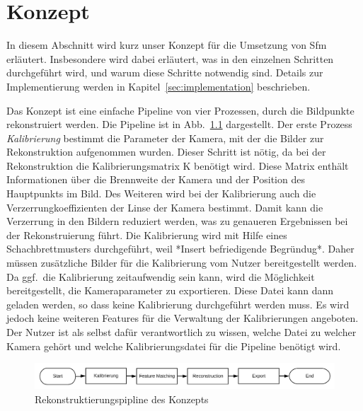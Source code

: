 
\chapter{Konzept}
In diesem Abschnitt wird kurz unser Konzept für die Umsetzung von Sfm erläutert. 
Insbesondere wird dabei erläutert, was in den einzelnen Schritten durchgeführt wird, und warum diese Schritte notwendig sind.
Details zur Implementierung werden in Kapitel~\ref{sec:implementation} beschrieben.

Das Konzept ist eine einfache Pipeline von vier Prozessen, durch die Bildpunkte rekonstruiert werden.
Die Pipeline ist in Abb.~\ref{fig:concept-pipeline} dargestellt.
Der erste Prozess \emph{Kalibrierung} bestimmt die Parameter der Kamera, mit der die Bilder zur Rekonstruktion aufgenommen wurden.
Dieser Schritt ist nötig, da bei der Rekonstruktion die Kalibrierungsmatrix K benötigt wird.
Diese Matrix enthält Informationen über die Brennweite der Kamera und der Position des Hauptpunkts im Bild.
Des Weiteren wird bei der Kalibrierung auch die Verzerrungkoeffizienten der Linse der Kamera bestimmt. %
Damit kann die Verzerrung in den Bildern reduziert werden, was zu genaueren Ergebnissen bei der Rekonstruierung führt.%
Die Kalibrierung wird mit Hilfe eines Schachbrettmusters durchgeführt, weil *Insert befriedigende Begründug*.
Daher müssen zusätzliche Bilder für die Kalibrierung vom Nutzer bereitgestellt werden.
Da ggf.\ die Kalibrierung zeitaufwendig sein kann, wird die Möglichkeit bereitgestellt, die Kameraparameter zu exportieren.
Diese Datei kann dann geladen werden, so dass keine Kalibrierung durchgeführt werden muss. 
Es wird jedoch keine weiteren Features für die Verwaltung der Kalibrierungen angeboten.
Der Nutzer ist als selbst dafür verantwortlich zu wissen, welche Datei zu welcher Kamera gehört und welche Kalibrierungsdatei für die Pipeline benötigt wird. 








\begin{figure}
    \centering
    \includegraphics{src/img/konzept-pipeline-horizontal.png}
    \caption{Rekonstruktierungspipline des Konzepts}
    \label{fig:concept-pipeline}
\end{figure}
